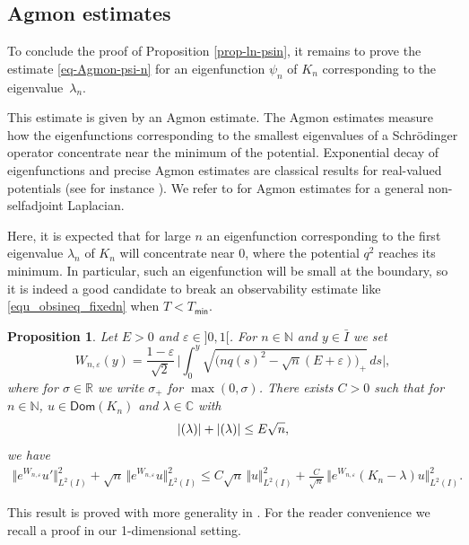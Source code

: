 \documentclass[JEP,XML,SOM,Unicode]{cedram}
\theoremstyle{plain}
\newtheorem{proposition}[theorem]{Proposition}
\theoremstyle{definition}
\newcommand{\abs}[1]{\vert #1\vert}
\newcommand{\bbabs}[1]{\biggl\vert #1\biggr\vert}
\newcommand{\nr}[1]{\Vert #1\Vert}
\newcommand{\bnr}[1]{\bigl\Vert #1\bigr\Vert}
\newcommand{\1}{\mathds 1}
\let\Re\relax
\DeclareMathOperator{\Re}{\mathsf{Re}\mkern2mu}
\let\Im\relax
\DeclareMathOperator{\Im}{\mathsf{Im}\mkern2mu}
\newcommand{\Dom}{\mathsf{Dom}}
\newcommand{\R}{\mathbb{R}}
\def\C{\mathbb{C}}
\newcommand{\N}{\mathbb{N}}
\let\e\varepsilon
\let\l\lambda
\let\s\sigma
\newcommand{\Tmin}{T_{\mathsf{min}}}
\begin{document}
\subsection{Agmon estimates} \label{sec-Agmon}

To conclude the proof of Proposition \ref{prop-ln-psin}, it remains to prove the estimate \eqref{eq-Agmon-psi-n} for an eigenfunction $\psi_n$ of $K_n$ corresponding to the eigenvalue~$\l_n$.

This estimate is given by an Agmon estimate. The Agmon estimates measure how the eigenfunctions corresponding to the smallest eigenvalues of a Schrödinger operator concentrate near the minimum of the potential. Exponential decay of eigenfunctions and precise Agmon estimates are classical results for real-valued potentials (see for instance \cite{Agmon85,helffer1}). We refer to \cite{KrejcirikRayRoySie17} for Agmon estimates for a general non-selfadjoint Laplacian.

Here, it is expected that for large $n$ an eigenfunction corresponding to the first eigenvalue $\l_n$ of $K_n$ will concentrate near 0, where the potential $q^2$ reaches its minimum. In particular, such an eigenfunction will be small at the boundary, so it is indeed a good candidate to break an observability estimate like \eqref{equ_obsineq_fixedn} when $T < \Tmin$.

\begin{proposition} \label{prop-Agmon}
Let $E > 0$ and $\e \in{}]0,1[$. For $n \in \N$ and $y \in \bar I$ we set
\begin{equation} \label{def-W}
W_{n,\e}(y) = \frac {1-\e} {\sqrt 2}\, \bbabs{\int_0^y \sqrt{\bigl(nq(s)^2 - \sqrt{n}(E + \e) \bigr)_+} \, ds},
\end{equation}
where for $\s \in \R$ we write $\s_+$ for $\max(0,\s)$. There exists $C > 0$ such that for $n \in \N$, $u \in \Dom(K_n)$ and $\l \in \C$ with
\begin{equation} \label{hyp-lambda}
\abs{\Re(\l)} + \abs{\Im(\l)} \leq E \sqrt n,
\end{equation}
we have
\begin{multline*}
\bnr{e^{W_{n,\e}} u'}_{L^2(I)}^2 + \sqrt n\,\bnr{e^{W_{n,\e}} u}_{L^2(I)}^2
\leq C \sqrt n\,\nr{u}_{L^2(I)}^2 +\frac {C}{\sqrt n}\, \bnr{e^{W_{n,\e}} (K_n-\l)u}_{L^2(I)}^2.
\end{multline*}
\end{proposition}

This result is proved with more generality in \cite{KrejcirikRayRoySie17}. For the reader convenience we recall a proof in our 1-dimensional setting.
\end{document}
